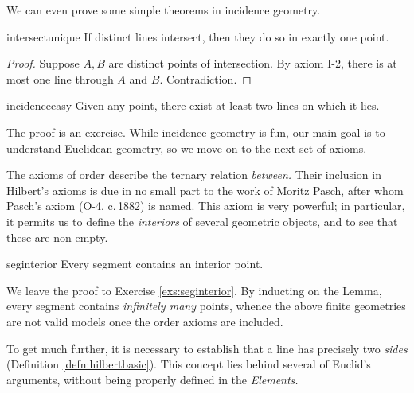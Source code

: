 We can even prove some simple theorems in incidence geometry.

\begin{lemm}{}{intersectunique}
	If distinct lines intersect, then they do so in exactly one point.
\end{lemm}

\begin{proof}
	Suppose $A,B$ are distinct points of intersection. By axiom I-2, there is at most one line through $A$ and $B$. Contradiction.
\end{proof}

\begin{lemm}{}{incidenceeasy}
	Given any point, there exist at least two lines on which it lies.
\end{lemm}

The proof is an exercise. While incidence geometry is fun, our main goal is to understand Euclidean geometry, so we move on to the next set of axioms.



The axioms of order describe the ternary relation \emph{between.} Their inclusion in Hilbert's axioms is due in no small part to the work of Moritz Pasch, after whom Pasch's axiom (O-4, c.\,1882) is named. This axiom is very powerful; in particular, it permits us to define the \emph{interiors} of several geometric objects, and to see that these are non-empty.

\begin{lemm}{}{seginterior}
	Every segment contains an interior point.
\end{lemm}

We leave the proof to Exercise \ref{exs:seginterior}. By inducting on the Lemma, every segment contains \emph{infinitely many} points, whence the above finite geometries are not valid models once the order axioms are included.

\goodbreak

To get much further, it is necessary to establish that a line has precisely two \emph{sides} (Definition \ref{defn:hilbertbasic}). This concept lies behind several of Euclid's arguments, without being properly defined in the \emph{Elements.}


